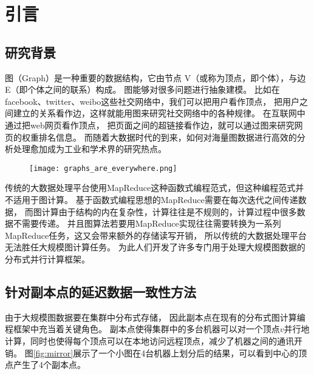 \chapter{引言}
\section{研究背景}

图（Graph）是一种重要的数据结构，它由节点 V（或称为顶点，即个体），与边 E（即个体之间的联系）构成。
图能够对很多问题进行抽象建模。
比如在facebook、twitter、weibo这些社交网络中，我们可以把用户看作顶点，
把用户之间建立的关系看作边，这样就能用图来研究社交网络中的各种规律。
在互联网中通过把web网页看作顶点，
把页面之间的超链接看作边，就可以通过图来研究网页的权重排名信息。
而随着大数据时代的到来，如何对海量图数据进行高效的分析处理愈加成为工业和学术界的研究热点。

\begin{figure}[!htbp]
  \centering
  \texttt{[image: graphs\_are\_everywhere.png]}
\end{figure}

传统的大数据处理平台使用MapReduce\cite{mapreduce}这种函数式编程范式，但这种编程范式并不适用于图计算。
基于函数式编程思想的MapReduce需要在每次迭代之间传递数据，
而图计算由于结构的内在复杂性，计算往往是不规则的，计算过程中很多数据不需要传递。
并且图算法若要用MapReduce实现往往需要转换为一系列MapReduce任务，这又会带来额外的存储读写开销，
所以传统的大数据处理平台无法胜任大规模图计算任务\cite{Malewicz@SIGMOD10}。
为此人们开发了许多专门用于处理大规模图数据的分布式并行计算框架。    
\cite{Malewicz@SIGMOD10, Low@12, Gonzalez@OSDI12, Zhu@OSDI16, Gonzalez@OSDI14, Avery@HS11, Shao@SIGMOD13, 
Chen@EuroSys15, Xie@PPoPP15, Roy@SOSP15, Seo@CloudCom10, Gregor@POOSC15, Hoque@TRIOS13, Teixeira@SOSP15}

\section{针对副本点的延迟数据一致性方法}

由于大规模图数据要在集群中分布式存储， 因此副本点在现有的分布式图计算编程框架中充当着关键角色。
副本点使得集群中的多台机器可以对一个顶点$v$并行地计算，同时也使得每个顶点可以在本地访问远程顶点，减少了机器之间的通讯开销。 
图\ref{fig:mirror}展示了一个小图在4台机器上划分后的结果，可以看到中心的顶点产生了4个副本点。


